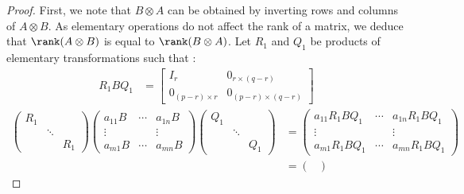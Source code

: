 \documentclass[11pt]{article}
\newcommand{\kp}{\otimes} %
\begin{document}
\begin{proof}
First, we note that $B\kp A$ can be obtained by inverting rows and columns of $A\kp B$. As elementary operations do not affect the rank of a matrix, we deduce that $\rank(A\kp B)$ is equal to $\rank(B\kp A)$.
Let $R_1$ and $Q_1$ be products of elementary transformations such that :
\begin{align*}
    R_1BQ_1 &=\begin{bmatrix}
    I_r & 0_{r\times(q-r)}\\
    0_{(p-r)\times r} & 0_{(p-r)\times (q-r)}
    \end{bmatrix}
\end{align*}
\begin{align*}
    \begin{pmatrix}
    R_1 & &\\
    & \ddots & \\
    & & R_1
    \end{pmatrix}
    \begin{pmatrix}
    a_{11}B & \cdots & a_{1n}B\\
    \vdots & & \vdots\\
    a_{m1}B & \cdots & a_{mn}B
    \end{pmatrix}
    \begin{pmatrix}
    Q_1 & &\\
    & \ddots & \\
    & & Q_1
    \end{pmatrix}
    &= \begin{pmatrix}
    a_{11}R_1BQ_1 & \cdots & a_{1n}R_1BQ_1\\
    \vdots & & \vdots\\
    a_{m1}R_1BQ_1 & \cdots & a_{mn}R_1BQ_1
    \end{pmatrix}\\
    &= \begin{pmatrix}

\end{pmatrix}
\end{align*}
\end{proof}
\end{document}

